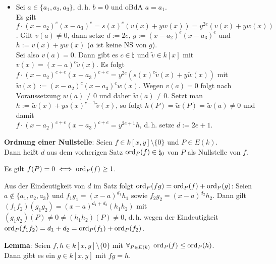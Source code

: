 \begin{Beweis}
\begin{itemize}
        \item
        Sei $a \in \{a_1, a_2, a_3\}$, d.\,h. $b = 0$ und oBdA $a = a_1$.\\
        Es gilt $f \cdot (x - a_2)^e (x - a_3)^e = s(x)^e (v(x) + yw(x)) = y^{2e} (v(x) + yw(x))$.
        Gilt $v(a) \not= 0$, dann setze $d := 2e$, $g := (x - a_2)^e (x - a_3)^e$ und
        $h := v(x) + yw(x)$ ($a$ ist keine NS von $g$).\\
        Sei also $v(a) = 0$.
        Dann gibt es $c \in \natural$ und $\widetilde{v} \in k[x]$ mit
        $v(x) = (x - a)^c \widetilde{v}(x)$.
        Es folgt $f \cdot (x - a_2)^{c+e} (x - a_3)^{c+e} =
        y^{2e} (s(x)^c \widetilde{v}(x) + y\widetilde{w}(x))$ mit
        $\widetilde{w}(x) := (x - a_2)^c (x - a_3)^c w(x)$.
        Wegen $v(a) = 0$ folgt nach Voraussetzung $w(a) \not= 0$ und daher
        $\widetilde{w}(a) \not= 0$.
        Setzt man $h := \widetilde{w}(x) + ys(x)^{c-1}\widetilde{v}(x)$, so folgt
        $h(P) = \widetilde{w}(P) = \widetilde{w}(a) \not= 0$ und damit\\
        $f \cdot (x - a_2)^{c+e} (x - a_3)^{c+e} = y^{2e+1} h$, d.\,h. setze $d := 2e + 1$.
        \vspace{-7mm}
    \end{itemize}
\end{Beweis}

\linie

\textbf{Ordnung einer Nullstelle}:
Seien $f \in k[x, y] \setminus \{0\}$ und $P \in E(k)$.\\
Dann heißt $d$ aus dem vorherigen Satz  $\operatorname{ord}_P(f) \in \natural_0$
von $P$ als Nullstelle von $f$.

Es gilt $f(P) = 0 \iff \operatorname{ord}_P(f) \ge 1$.

Aus der Eindeutigkeit von $d$ im Satz folgt $\operatorname{ord}_P(fg) = \operatorname{ord}_P(f) + \operatorname{ord}_P(g)$:
Seien $a \notin \{a_1, a_2, a_3\}$ und $f_1 g_1 = (x - a)^{d_1} h_1$ sowie
$f_2 g_2 = (x - a)^{d_2} h_2$.
Dann gilt $(f_1 f_2) (g_1 g_2) = (x - a)^{d_1 + d_2} (h_1 h_2)$
mit $(g_1 g_2)(P) \not= 0 \not= (h_1 h_2)(P) \not= 0$,
d.\,h. wegen der Eindeutigkeit\\
$\operatorname{ord}_P(f_1 f_2) = d_1 + d_2 = \operatorname{ord}_P(f_1) + \operatorname{ord}_P(f_2)$.

\linie
\pagebreak

\textbf{Lemma}:
Seien $f, h \in k[x, y] \setminus \{0\}$ mit $\forall_{P \in E(k)}\; \operatorname{ord}_P(f) \le \operatorname{ord}_P(h)$.\\
Dann gibt es ein $g \in k[x, y]$ mit $fg = h$.

